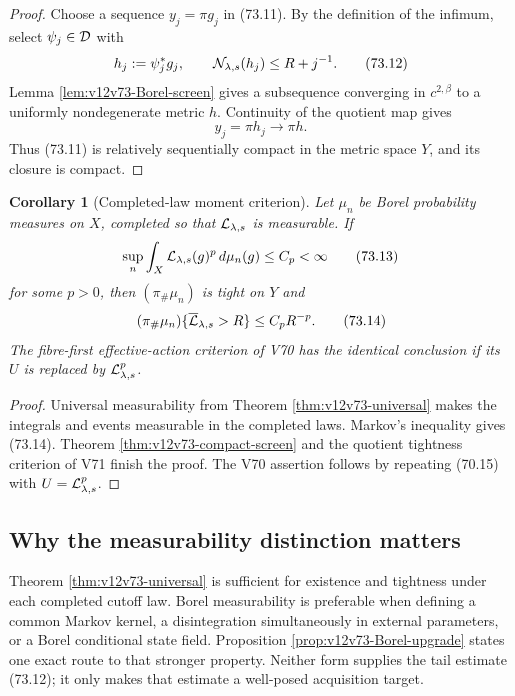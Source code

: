\documentclass[11pt]{article}
\newtheorem{corollary}[theorem]{Corollary}
\theoremstyle{remark}
\begin{document}
\begin{proof}
Choose a sequence \(y_j=\pi g_j\) in (73.11).  By the definition of
the infimum, select \(\psi_j\in{\cal D}\) with
\[
 h_j:=\psi_j^*g_j,\qquad
 {\cal N}_{\lambda,s}(h_j)\leq R+j^{-1}.                    \tag{73.12}
\]
Lemma \ref{lem:v12v73-Borel-screen} gives a subsequence converging in
\(c^{2,\beta}\) to a uniformly nondegenerate metric \(h\).
Continuity of the quotient map gives
\[
                             y_j=\pi h_j\longrightarrow\pi h.
\]
Thus (73.11) is relatively sequentially compact in the metric space
\(Y\), and its closure is compact.
\end{proof}

\begin{corollary}[Completed-law moment criterion]
\label{cor:v12v73-moment}
Let \(\mu_n\) be Borel probability measures on \(X\), completed so
that \({\cal L}_{\lambda,s}\) is measurable.  If
\begin{equation}
 \sup_n\int_X{\cal L}_{\lambda,s}(g)^p\,d\mu_n(g)
 \leq C_p<\infty                                             \tag{73.13}
\end{equation}
for some \(p>0\), then \((\pi_\#\mu_n)\) is tight on \(Y\) and
\begin{equation}
 (\pi_\#\mu_n)
 \{\overline{\cal L}_{\lambda,s}>R\}
 \leq C_pR^{-p}.                                            \tag{73.14}
\end{equation}
The fibre-first effective-action criterion of V70 has the identical
conclusion if its \(U\) is replaced by
\({\cal L}_{\lambda,s}^p\).
\end{corollary}

\begin{proof}
Universal measurability from Theorem
\ref{thm:v12v73-universal} makes the integrals and events measurable
in the completed laws.  Markov's inequality gives (73.14).
Theorem \ref{thm:v12v73-compact-screen} and the quotient tightness
criterion of V71 finish the proof.  The V70 assertion follows by
repeating (70.15) with \(U={\cal L}_{\lambda,s}^p\).
\end{proof}

\subsection{Why the measurability distinction matters}

Theorem \ref{thm:v12v73-universal} is sufficient for existence and
tightness under each completed cutoff law.  Borel measurability is
preferable when defining a common Markov kernel, a disintegration
simultaneously in external parameters, or a Borel conditional state
field.  Proposition \ref{prop:v12v73-Borel-upgrade} states one exact
route to that stronger property.  Neither form supplies the tail
estimate (73.12); it only makes that estimate a well-posed
acquisition target.
\end{document}
